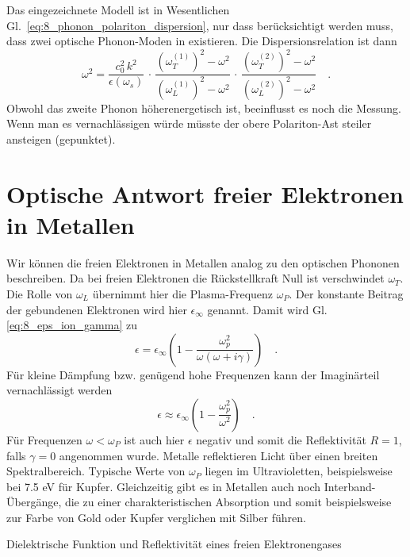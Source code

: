 Das eingezeichnete Modell ist in Wesentlichen Gl.~\ref{eq:8_phonon_polariton_dispersion}, nur dass berücksichtigt werden muss, dass zwei optische Phonon-Moden in  existieren. Die Dispersionsrelation ist dann
\begin{equation}
    \omega^2 = \frac{c_0^2 \, k^2}{\epsilon(\omega_s)} \, \cdot  \,
    \frac{\left(\omega_T^{(1)} \right)^2 - \omega^2}{   \left(\omega_L^{(1)} \right)^2 - \omega^2 }  \, \cdot \,
    \frac{\left(\omega_T^{(2)} \right)^2 - \omega^2}{   \left(\omega_L^{(2)} \right)^2 - \omega^2}  \quad .
\end{equation}
Obwohl das zweite Phonon höherenergetisch ist, beeinflusst es noch die Messung. Wenn man es vernachlässigen würde müsste der obere Polariton-Ast steiler ansteigen (gepunktet).



\section*{Optische Antwort freier Elektronen in Metallen}


Wir können die freien Elektronen in Metallen analog zu den optischen Phononen beschreiben. Da bei freien Elektronen die Rückstellkraft Null ist verschwindet $\omega_T$. Die Rolle von $\omega_L$ übernimmt hier die Plasma-Frequenz $\omega_P$. Der konstante Beitrag der gebundenen Elektronen wird hier $\epsilon_\infty$ genannt. Damit wird Gl. \ref{eq:8_eps_ion_gamma} zu
\begin{equation}
    \epsilon     = \epsilon_\infty \left(1  - \frac{\omega_p^2}{\omega(\omega + i  \gamma)} \right) \quad .
     \label{eq:8_eps_metall_gamma}
\end{equation}
Für kleine Dämpfung bzw. genügend hohe Frequenzen kann der Imaginärteil vernachlässigt werden
\begin{equation}
    \epsilon \approx  \epsilon_\infty \left( 1  - \frac{\omega_p^2}{\omega^2} \right) \quad .
\end{equation}
Für Frequenzen $\omega < \omega_P$ ist auch hier $\epsilon$ negativ und somit die Reflektivität $R=1$, falls $\gamma = 0$ angenommen wurde. Metalle reflektieren Licht über einen breiten Spektralbereich. Typische Werte von $\omega_P$ liegen im Ultravioletten, beispielsweise bei 7.5 eV für Kupfer. Gleichzeitig gibt es in Metallen auch noch Interband-Übergänge, die zu einer charakteristischen Absorption und somit beispielsweise zur Farbe von Gold oder Kupfer verglichen mit Silber führen.

\begin{marginfigure}[-60mm]
    \caption{Dielektrische Funktion und Reflektivität eines freien Elektronengases}
\end{marginfigure}
    



